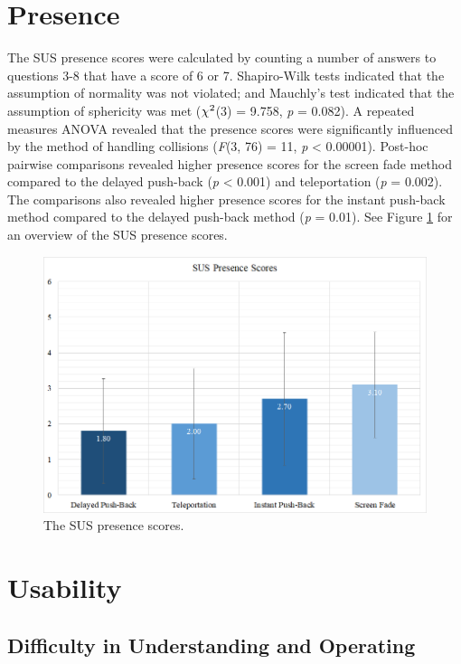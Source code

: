 \section{Presence}

The SUS presence scores were calculated by counting a number of answers to questions 3-8 that have a score of 6 or 7. Shapiro-Wilk tests
indicated that the assumption of normality was not violated; and Mauchly's test indicated that the assumption of sphericity was met (\textit{$\chi\textsuperscript{2}$}(3) = 9.758, \textit{p} = 0.082). A repeated measures ANOVA revealed that the presence scores were significantly influenced by the method of handling collisions (\textit{F}(3, 76) = 11, \textit{p} < 0.00001). Post-hoc pairwise comparisons revealed higher presence scores for the screen fade method compared to the delayed push-back (\textit{p} < 0.001) and teleportation (\textit{p} = 0.002). The comparisons also revealed higher presence scores for the instant push-back method compared to the delayed push-back method (\textit{p} = 0.01). See Figure \ref{fig:presence_scores} for an overview of the SUS presence scores.

\begin{figure}[th]
\centering
\includegraphics[width=1\textwidth]{img/presence_scores.png}
\caption{The SUS presence scores.}
\label{fig:presence_scores}
\end{figure}

\section{Usability}

\subsection{Difficulty in Understanding and Operating}

